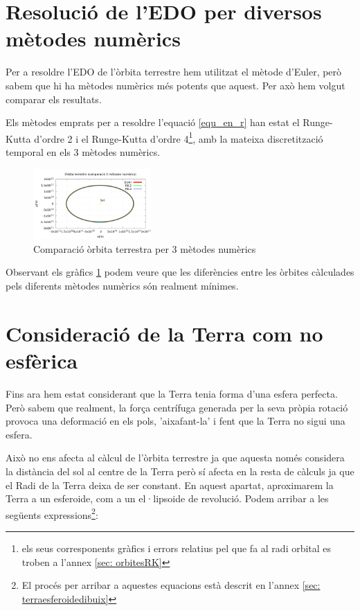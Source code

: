 \documentclass[11pt]{article}
\begin{document}
\section{Resolució de l'EDO per diversos mètodes numèrics}\label{sec: edos}
Per a resoldre l'EDO de l'òrbita terrestre hem utilitzat el mètode d'Euler, però sabem que hi ha mètodes numèrics més potents que aquest. Per axò hem volgut comparar els resultats.

Els mètodes emprats per a resoldre l'equació \eqref{equ_en_r} han estat el Runge-Kutta d'ordre 2 i el Runge-Kutta d'ordre 4\footnote{els seus corresponents gràfics i errors relatius pel que fa al radi orbital es troben a l'annex \ref{sec: orbitesRK}}, amb la mateixa discretització temporal en els 3 mètodes numèrics.

\begin{figure}[H]
    \centering
    \includegraphics[width=0.4\textwidth]{orbita3met.PNG}
    \caption{Comparació òrbita terrestra per 3 mètodes numèrics}
    \label{fig: orbita3met}
\end{figure}

Observant els gràfics \ref{fig: orbita3met} podem veure que les diferències entre les òrbites càlculades pels diferents mètodes numèrics són realment mínimes.

\section{Consideració de la Terra com no esfèrica}\label{sec: terranoesfera}
Fins ara hem estat considerant que la Terra tenia forma d'una esfera perfecta. Però sabem que realment, la força centrífuga generada per la seva pròpia rotació provoca una deformació en els pols, 'aixafant-la' i fent que la Terra no sigui una esfera.

Això no ens afecta al càlcul de l'òrbita terrestre ja que aquesta només considera la distància del sol al centre de la Terra però sí afecta en la resta de càlculs ja que el Radi de la Terra deixa de ser constant. En aquest apartat, aproximarem la Terra a un esferoide, com a un el·lipsoide de revolució. Podem arribar a les següents expressions\footnote{El procés per arribar a aquestes equacions està descrit en l'annex \ref{sec: terraesferoidedibuix}}:
\end{document}
